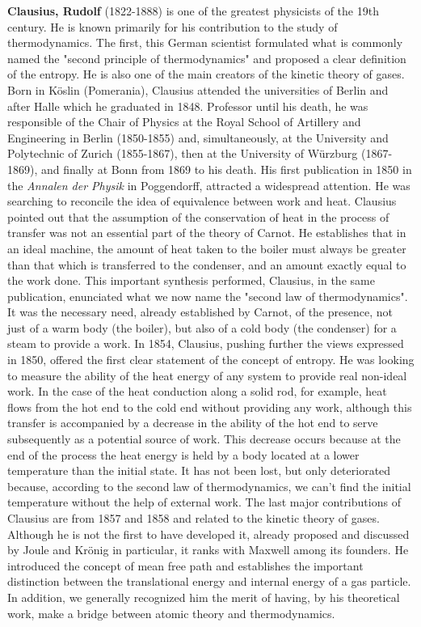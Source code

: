 \textbf{Clausius, Rudolf} (1822-1888) is one of the greatest physicists of the 19th century. He is known primarily for his contribution to the study of thermodynamics. The first, this German scientist formulated what is commonly named the "second principle of thermodynamics" and proposed a clear definition of the entropy. He is also one of the main creators of the kinetic theory of gases. Born in Köslin (Pomerania), Clausius attended the universities of Berlin and after Halle which he graduated in 1848. Professor until his death, he was responsible of the Chair of Physics at the Royal School of Artillery and Engineering in Berlin (1850-1855) and, simultaneously, at the University and Polytechnic of Zurich (1855-1867), then at the University of Würzburg (1867-1869), and finally at Bonn from 1869 to his death. His first publication in 1850 in the \textit{Annalen der Physik} in Poggendorff, attracted a widespread attention. He was searching to reconcile the idea of equivalence between work and heat. Clausius pointed out that the assumption of the conservation of heat in the process of transfer was not an essential part of the theory of Carnot. He establishes that in an ideal machine, the amount of heat taken to the boiler must always be greater than that which is transferred to the condenser, and an amount exactly equal to the work done. This important synthesis performed, Clausius, in the same publication, enunciated what we now name the "second law of thermodynamics". It was the necessary need, already established by Carnot, of the presence, not just of a warm body (the boiler), but also of a cold body (the condenser) for a steam to provide a work. In 1854, Clausius, pushing further the views expressed in 1850, offered the first clear statement of the concept of entropy. He was looking to measure the ability of the heat energy of any system to provide real non-ideal work. In the case of the heat conduction along a solid rod, for example, heat flows from the hot end to the cold end without providing any work, although this transfer is accompanied by a decrease in the ability of the hot end to serve subsequently as a potential source of work. This decrease occurs because at the end of the process the heat energy is held by a body located at a lower temperature than the initial state. It has not been lost, but only deteriorated because, according to the second law of thermodynamics, we can't find the initial temperature without the help of external work. The last major contributions of Clausius are from 1857 and 1858 and related to the kinetic theory of gases. Although he is not the first to have developed it, already proposed and discussed by Joule and Krönig in particular, it ranks with Maxwell among its founders. He introduced the concept of mean free path and establishes the important distinction between the translational energy and internal energy of a gas particle. In addition, we generally recognized him the merit of having, by his theoretical work, make a bridge between atomic theory and thermodynamics.

